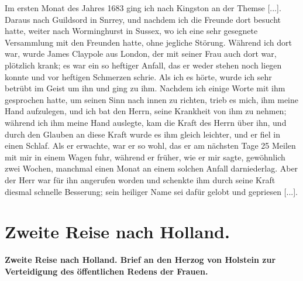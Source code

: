 Im ersten Monat des Jahres 1683 ging ich nach Kingston
an der Themse [...]. Daraus nach Guildsord in Snrrey, und
nachdem ich die Freunde dort besucht hatte, weiter nach 
Worminghurst in Sussex, wo ich 
eine sehr gesegnete Versammlung
mit den Freunden hatte, ohne jegliche Störung. Während ich
dort war, wurde James Claypole aus London, der mit seiner
Frau auch dort war, plötzlich krank; es war ein so heftiger Anfall,
das er weder stehen noch liegen konnte und vor heftigen Schmerzen
schrie. Als ich es hörte, wurde ich sehr betrübt im Geist um ihn
und ging zu ihm. Nachdem ich einige Worte mit ihm gesprochen
hatte, um seinen Sinn nach innen zu richten, trieb es mich, ihm
meine Hand aufzulegen, und ich bat den Herrn, seine Krankheit
von ihm zu nehmen; während ich ihm meine Hand auslegte, kam
die Kraft des Herrn über ihn, und durch den Glauben an diese
Kraft wurde es ihm gleich leichter, und er fiel in einen Schlaf.
Als er erwachte, war er so wohl, das er am nächsten Tage
25 Meilen mit mir in einem Wagen fuhr, während er früher,
wie er mir sagte, gewöhnlich zwei Wochen, manchmal einen
Monat an einem solchen Anfall darniederlag. Aber der Herr
war für ihn angerufen worden und schenkte ihm durch seine Kraft
diesmal schnelle Besserung; sein heiliger Name sei dafür gelobt
und gepriesen [...].

\chapter[Zweite Reise nach Holland.]{Zweite Reise nach Holland.}

\begin{center}
\textbf{Zweite Reise nach Holland. Brief an den Herzog von Holstein
zur Verteidigung des öffentlichen Redens der Frauen.}
\end{center}


